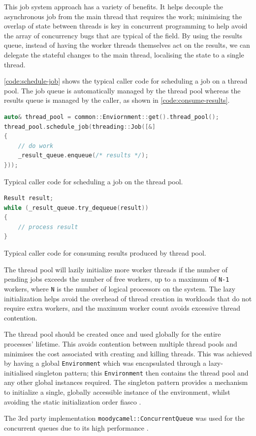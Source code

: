 This job system approach has a variety of benefits. It helps decouple the asynchronous job from the main thread that requires the work; minimising the overlap of state between threads is key in concurrent programming to help avoid the array of concurrency bugs that are typical of the field. By using the results queue, instead of having the worker threads themselves act on the results, we can delegate the stateful changes to the main thread, localising the state to a single thread.

\autoref{code:schedule-job} shows the typical caller code for scheduling a job on a thread pool. The job queue is automatically managed by the thread pool whereas the results queue is managed by the caller, as shown in \autoref{code:consume-results}.

\begin{lstfloat}[H]
    \begin{lstlisting}[language=c++]
auto& thread_pool = common::Enviornment::get().thread_pool();
thread_pool.schedule_job(threading::Job([&]
{
    // do work
    _result_queue.enqueue(/* results */);
}));
    \end{lstlisting}
    \caption{Typical caller code for scheduling a job on the thread pool.}
    \label{code:schedule-job}
\end{lstfloat}

\begin{lstfloat}[H]
    \begin{lstlisting}[language=c++]
Result result;
while (_result_queue.try_dequeue(result))
{
    // process result
}
    \end{lstlisting}
    \caption{Typical caller code for consuming results produced by thread pool.}
    \label{code:consume-results}
\end{lstfloat}

The thread pool will lazily initialize more worker threads if the number of pending jobs exceeds the number of free workers, up to a maximum of \texttt{N-1} workers, where \texttt{N} is the number of logical processors on the system. The lazy initialization helps avoid the overhead of thread creation in workloads that do not require extra workers, and the maximum worker count avoids excessive thread contention.

The thread pool should be created once and used globally for the entire processes' lifetime. This avoids contention between multiple thread pools and minimises the cost associated with creating and killing threads. This was achieved by having a global \texttt{Environment} which was encapsulated through a lazy-initialised singleton pattern; this \texttt{Environment} then contains the thread pool and any other global instances required. The singleton pattern provides a mechanism to initialize a single, globally accessible instance of the environment, whilst avoiding the static initialization order fiasco \cite{cpp-siof}.

The 3rd party implementation \texttt{moodycamel::ConcurrentQueue} \cite{moodycamel} was used for the concurrent queues due to its high performance \cite{moodycamel-benchmark}.

